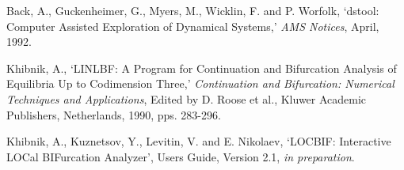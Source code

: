 \begin{thebibliography}{99}

 Back, A., Guckenheimer, G., Myers, M., Wicklin, F. and
P. Worfolk, `dstool: Computer Assisted Exploration of Dynamical Systems,'
{\em AMS Notices}, April, 1992.

 Khibnik, A., `LINLBF: A Program for Continuation and
Bifurcation Analysis of Equilibria Up to Codimension Three,'
{\em Continuation and Bifurcation: Numerical Techniques and Applications},
Edited by D. Roose et al., Kluwer Academic Publishers, Netherlands, 
1990, pps. 283-296.

 Khibnik, A., Kuznetsov, Y., Levitin, V. and E. Nikolaev,
`LOCBIF: Interactive LOCal BIFurcation Analyzer', Users Guide, Version 2.1,
{\em in preparation}.

\end{thebibliography}
 
